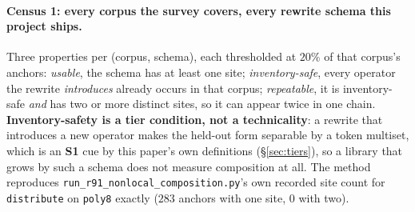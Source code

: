 \paragraph{Census 1: every corpus the survey covers, every rewrite schema this project ships.} Three properties per (corpus, schema), each thresholded at $20\%$ of that corpus's anchors: \emph{usable}, the schema has at least one site; \emph{inventory-safe}, every operator the rewrite \emph{introduces} already occurs in that corpus; \emph{repeatable}, it is inventory-safe \emph{and} has two or more distinct sites, so it can appear twice in one chain. \textbf{Inventory-safety is a tier condition, not a technicality}: a rewrite that introduces a new operator makes the held-out form separable by a token multiset, which is an \textbf{S1} cue by this paper's own definitions (\S\ref{sec:tiers}), so a library that grows by such a schema does not measure composition at all. The method reproduces \texttt{run\_r91\_nonlocal\_composition.py}'s own recorded site count for \texttt{distribute} on \texttt{poly8} exactly ($283$ anchors with one site, $0$ with two).

